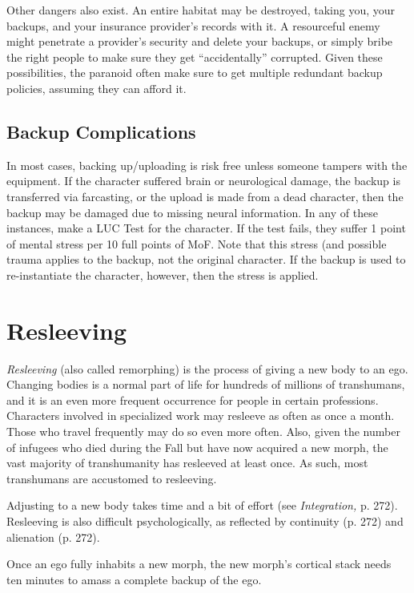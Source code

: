 Other dangers also exist. An entire habitat may be 
destroyed, taking you, your backups, and your insurance
provider's records with it. A resourceful enemy
might penetrate a provider's security and delete your 
backups, or simply bribe the right people to make 
sure they get ``accidentally'' corrupted. Given these 
possibilities, the paranoid often make sure to get 
multiple redundant backup policies, assuming they 
can afford it.

\subsection{Backup Complications}

In most cases, backing up/uploading is risk free unless 
someone tampers with the equipment. If the character 
suffered brain or neurological damage, the backup is 
transferred via farcasting, or the upload is made from 
a dead character, then the backup may be damaged 
due to missing neural information. In any of these 
instances, make a LUC Test for the character. If the 
test fails, they suffer 1 point of mental stress per 10 
full points of MoF. Note that this stress (and possible
trauma applies to the backup, not the original
character. If the backup is used to re-instantiate the 
character, however, then the stress is applied.

\section{Resleeving}

\textit{Resleeving} (also called remorphing) is the process 
of giving a new body to an ego. Changing bodies 
is a normal part of life for hundreds of millions of 
transhumans, and it is an even more frequent occurrence
for people in certain professions. Characters
involved in specialized work may resleeve as often as 
once a month. Those who travel frequently may do so 
even more often. Also, given the number of infugees 
who died during the Fall but have now acquired a 
new morph, the vast majority of transhumanity has 
resleeved at least once. As such, most transhumans are 
accustomed to resleeving.

Adjusting to a new body takes time and a bit of 
effort (see \textit{Integration,} p. 272). Resleeving is also difficult
psychologically, as reflected by continuity (p. 272)
and alienation (p. 272).

Once an ego fully inhabits a new morph, the new 
morph's cortical stack needs ten minutes to amass a 
complete backup of the ego.


